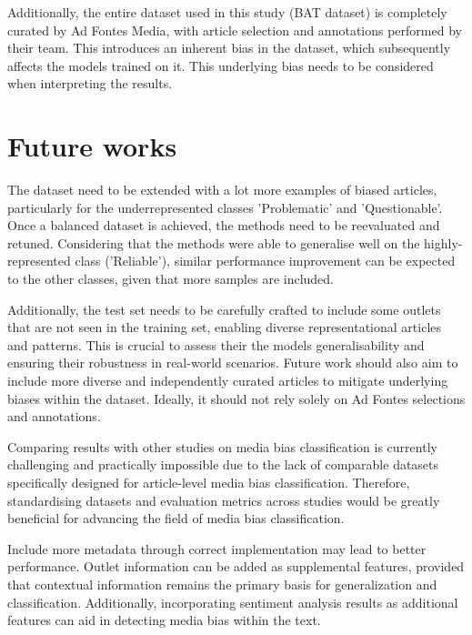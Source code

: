 Additionally, the entire dataset used in this study (BAT dataset) is completely curated by Ad Fontes Media, with article selection and annotations performed by their team. This introduces an inherent bias in the dataset, which subsequently affects the models trained on it. This underlying bias needs to be considered when interpreting the results.

\section{Future works}

The dataset need to be extended with a lot more examples of biased articles, particularly for the underrepresented classes 'Problematic' and 'Questionable'. Once a balanced dataset is achieved, the methods need to be reevaluated and retuned. Considering that the methods were able to generalise well on the highly-represented class ('Reliable'), similar performance improvement can be expected to the other classes, given that more samples are included.

Additionally, the test set needs to be carefully crafted to include some outlets that are not seen in the training set, enabling diverse representational articles and patterns. This is crucial to assess their the models generalisability and ensuring their robustness in real-world scenarios. Future work should also aim to include more diverse and independently curated articles to mitigate underlying biases within the dataset. Ideally, it should not rely solely on Ad Fontes selections and annotations.

Comparing results with other studies on media bias classification is currently challenging and practically impossible due to the lack of comparable datasets specifically designed for article-level media bias classification. Therefore, standardising datasets and evaluation metrics across studies would be greatly beneficial for advancing the field of media bias classification.

Include more metadata through correct implementation may lead to better performance. Outlet information can be added as supplemental features, provided that contextual information remains the primary basis for generalization and classification. Additionally, incorporating sentiment analysis results as additional features can aid in detecting media bias within the text.

